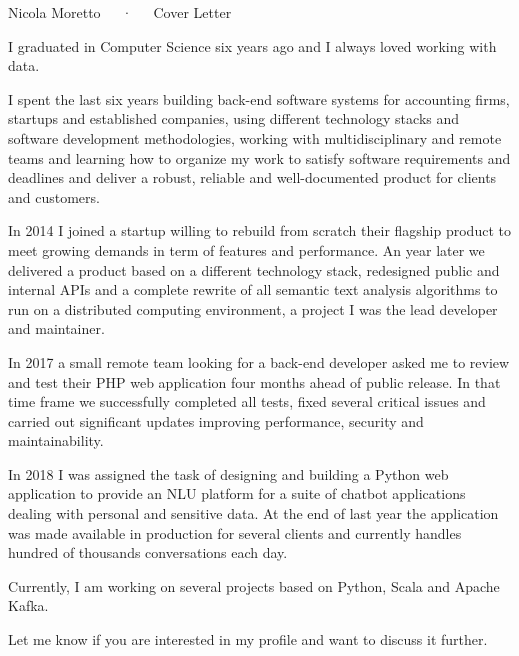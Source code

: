 \documentclass[11pt, a4paper]{awesome-cv}
\begin{document}
\makecvheader[R]

\makecvfooter
  {}
  {Nicola Moretto~~~·~~~Cover Letter}
  {}

\makelettertitle

\begin{cvletter}



I graduated in Computer Science six years ago and I always loved working with data.

I spent the last six years building back-end software systems for accounting firms, startups and established companies, using different technology stacks and software development methodologies, working with multidisciplinary and remote teams and learning how to organize my work to satisfy software requirements and deadlines and deliver a robust, reliable and well-documented product for clients and customers.

In 2014 I joined a startup willing to rebuild from scratch their flagship product to meet growing demands in term of features and performance. An year later we delivered a product based on a different technology stack, redesigned public and internal APIs and a complete rewrite of all semantic text analysis algorithms to run on a distributed computing environment, a project I was the lead developer and maintainer.

In 2017 a small remote team looking for a back-end developer asked me to review and test their PHP web application four months ahead of public release. In that time frame we successfully completed all tests, fixed several critical issues and carried out significant updates improving performance, security and maintainability.

In 2018 I was assigned the task of designing and building a Python web application to provide an NLU platform for a suite of chatbot applications dealing with personal and sensitive data. At the end of last year the application was made available in production for several clients and currently handles hundred of thousands conversations each day.

Currently, I am working on several projects based on Python, Scala and Apache Kafka. 

Let me know if you are interested in my profile and want to discuss it further.

\end{cvletter}


\makeletterclosing
\end{document}
